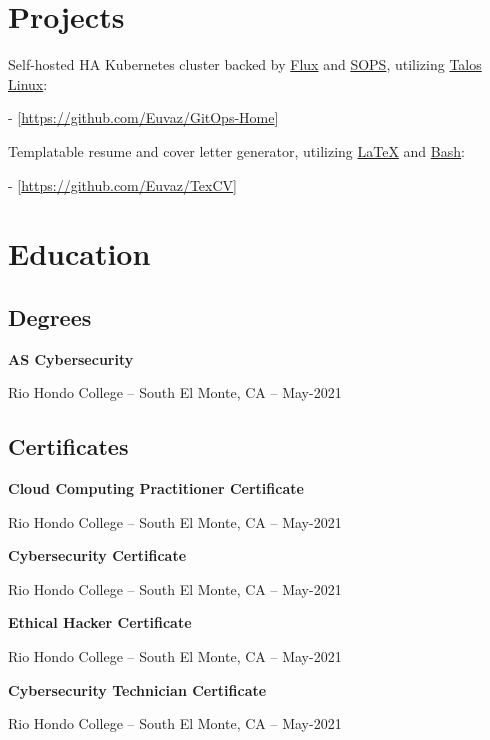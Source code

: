 \documentclass[a4paper]{article}
\begin{document}
\section{Projects}
Self-hosted HA Kubernetes cluster backed by \href{https://toolkit.fluxcd.io}{Flux} and \href{https://toolkit.fluxcd.io/guides/mozilla-sops}{SOPS}, utilizing \href{https://www.talos.dev/}{Talos Linux}:\par
- [\url{https://github.com/Euvaz/GitOps-Home}]

\medskip
Templatable resume and cover letter generator, utilizing \href{https://www.latex-project.org/}{LaTeX} and \href{https://www.gnu.org/software/bash/}{Bash}:\par
- [\url{https://github.com/Euvaz/TexCV}]

\section{Education}
\subsection{Degrees}
\begin{minipage}{\textwidth}
\textbf{AS Cybersecurity}\par
Rio Hondo College -- South El Monte, CA -- May-2021
\end{minipage}

\vspace{20pt}
\subsection{Certificates}
\begin{minipage}{\textwidth}
\textbf{Cloud Computing Practitioner Certificate}\par
Rio Hondo College -- South El Monte, CA -- May-2021

\medskip
\textbf{Cybersecurity Certificate}\par
Rio Hondo College -- South El Monte, CA -- May-2021

\medskip
\textbf{Ethical Hacker Certificate}\par
Rio Hondo College -- South El Monte, CA -- May-2021

\medskip
\textbf{Cybersecurity Technician Certificate}\par
Rio Hondo College -- South El Monte, CA -- May-2021
\end{minipage}
\end{document}
